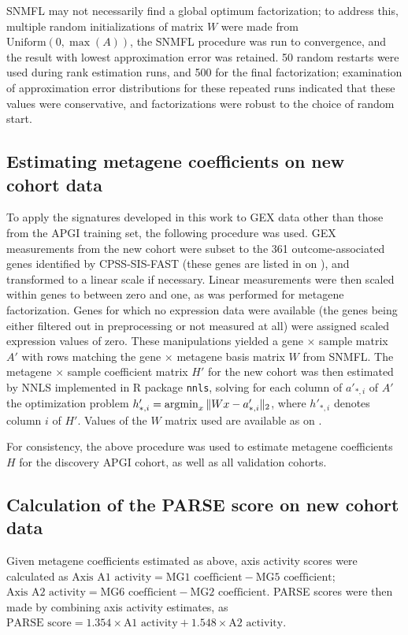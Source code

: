\documentclass[dissertation.tex]{subfiles}
\begin{document}
\gls{SNMFL} may not necessarily find a global optimum factorization; to address this, multiple random initializations of matrix $W$ were made from $\text{Uniform}(0, \max(A))$, the \gls{SNMFL} procedure was run to convergence, and the result with lowest approximation error was retained.  50 random restarts were used during rank estimation runs, and 500 for the final factorization; examination of approximation error distributions for these repeated runs indicated that these values were conservative, and factorizations were robust to the choice of random start.

\subsection{Estimating metagene coefficients on new cohort data}
To apply the signatures developed in this work to \gls{GEX} data other than those from the \gls{APGI} training set, the following procedure was used.  \Gls{GEX} measurements from the new cohort were subset to the 361 outcome-associated genes identified by \gls{CPSS}-\gls{SIS}-\gls{FAST} (these genes are listed in  on ), and transformed to a linear scale if necessary.  Linear measurements were then scaled within genes to between zero and one, as was performed for metagene factorization.  Genes for which no expression data were available (the genes being either filtered out in preprocessing or not measured at all) were assigned scaled expression values of zero.  These manipulations yielded a gene $\times$ sample matrix $A'$ with rows matching the gene $\times$ metagene basis matrix $W$ from \gls{SNMFL}.  The metagene $\times$ sample coefficient matrix $H'$ for the new cohort was then estimated by \gls{NNLS} implemented in R package \texttt{nnls}, solving for each column of $a'_{*,i}$ of $A'$ the optimization problem ${h'_{*,i}} = \operatorname*{\arg\!\min}_x \| W x - a'_{*,i} \|_2$, where $h'_{*,i}$ denotes column $i$ of $H'$.  Values of the $W$ matrix used are available as  on .

For consistency, the above procedure was used to estimate metagene coefficients $H$ for the discovery \gls{APGI} cohort, as well as all validation cohorts.

\subsection{Calculation of the \acrshort{PARSE} score on new cohort data}
Given metagene coefficients estimated as above, axis activity scores were calculated as $\text{Axis A1 activity} = \text{MG1 coefficient} - \text{MG5 coefficient}$; $\text{Axis A2 activity} = \text{MG6 coefficient} - \text{MG2 coefficient}$.  \gls{PARSE} scores were then made by combining axis activity estimates, as $\text{PARSE score} = 1.354 \times \text{A1 activity} + 1.548 \times \text{A2 activity}$.
\end{document}
